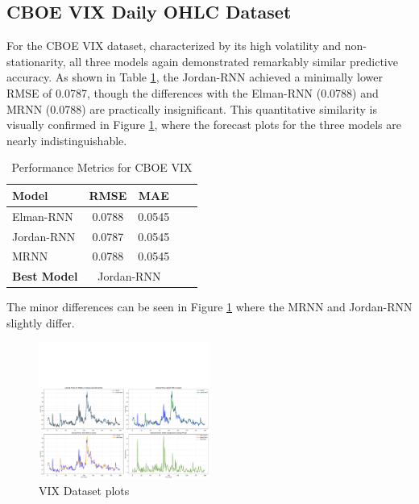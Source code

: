 \documentclass[conference, 10pt]{IEEEtran}
\begin{document}
\subsection{CBOE VIX Daily OHLC Dataset}
For the CBOE VIX dataset, characterized by its high volatility and non-stationarity, all three models again demonstrated
remarkably similar predictive accuracy. As shown in Table \ref{tab:results_vix}, the Jordan-RNN achieved a minimally
lower RMSE of 0.0787, though the differences with the Elman-RNN (0.0788) and MRNN (0.0788) are practically
insignificant. This quantitative similarity is visually confirmed in Figure \ref{fig:plots_vix}, where the forecast
plots for the three models are nearly indistinguishable.
\begin{table}[H]
    \centering
    \begin{tabular}{|l|c|c|c|c|}
        \hline
        \textbf{Model}& \textbf{RMSE} & \textbf{MAE}  \\ 
        \hline
        Elman-RNN& 0.0788 & 0.0545 \\ 
        \hline
        Jordan-RNN & 0.0787 & 0.0545  \\ 
        \hline
        MRNN & 0.0788 & 0.0545  \\ 
        \hline
        \textbf{Best Model} & \multicolumn{2}{c|}{{Jordan-RNN}} \\ 
        \hline
    \end{tabular}
    \vspace{4pt}
    \caption{Performance Metrics for CBOE VIX}
    \label{tab:results_vix}
\end{table}
The minor differences can be seen in Figure
\ref{fig:plots_vix} where the MRNN and Jordan-RNN slightly differ.

\begin{figure}[H]
    \centering
    \includegraphics[width=0.5\textwidth]{plots/rnn_model_comparison_vix.pdf}
    \caption{VIX Dataset plots}
    \label{fig:plots_vix}
\end{figure}
\end{document}
